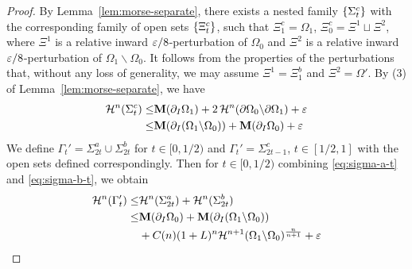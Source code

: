 \begin{lemma}
\begin{proof}
        By Lemma~\ref{lem:morse-separate}, there exists a nested family $\left\{\Sigma_t^c\right\}$ with the corresponding family of open sets $\left\{\Xi_t^c\right\}$, such that $\Xi_1^c = \Omega_1$, $\Xi_0^c = \Xi^1\sqcup \Xi^2$, where $\Xi^1$ is a relative inward $\varepsilon/8$-perturbation of $\Omega_0$ and $\Xi^2$ is a relative inward $\varepsilon/8$-perturbation of $\Omega_1\backslash\Omega_0$. It follows from the properties of the perturbations that, without any loss of generality, we may assume $\Xi^1 = \Xi_1^b$ and $\Xi^2 = \Omega'$. By (3) of Lemma~\ref{lem:morse-separate}, we have
        \begin{equation*}
        \begin{split}
            \mathcal{H}^n(\Sigma_t^c) \leq& \mathbf{M}(\partial_I\Omega_1) + 2\,\mathcal{H}^n(\partial\Omega_0\backslash\partial\Omega_1) + \varepsilon\\
            \leq& \mathbf{M}(\partial_I(\Omega_1\backslash\Omega_0)) + \mathbf{M}(\partial_I\Omega_0) + \varepsilon
        \end{split}
        \end{equation*}
        We define $\Gamma_t' = \Sigma_{2t}^a\cup\Sigma_{2t}^b$ for $t \in [0, 1/2)$ and $\Gamma_t' = \Sigma_{2t - 1}^c$, $t \in [1/2, 1]$ with the open sets defined correspondingly. Then for $t \in [0, 1/2)$ combining \ref{eq:sigma-a-t} and \ref{eq:sigma-b-t}, we obtain
        \begin{equation*}
            \begin{split}
                \mathcal{H}^n(\Gamma_t') \leq&
                \mathcal{H}^n(\Sigma_{2t}^a) + \mathcal{H}^n(\Sigma_{2t}^b)\\
                \leq&  \mathbf{M}(\partial_I\Omega_0) + \mathbf{M}(\partial_I(\Omega_1\backslash\Omega_0))\\
                &+ C(n)(1 + L)^n\mathcal{H}^{n+1}(\Omega_1\backslash\Omega_0)^{\frac{n}{n + 1}} + \varepsilon
            \end{split}
        \end{equation*}
    \end{proof}
\end{lemma}
